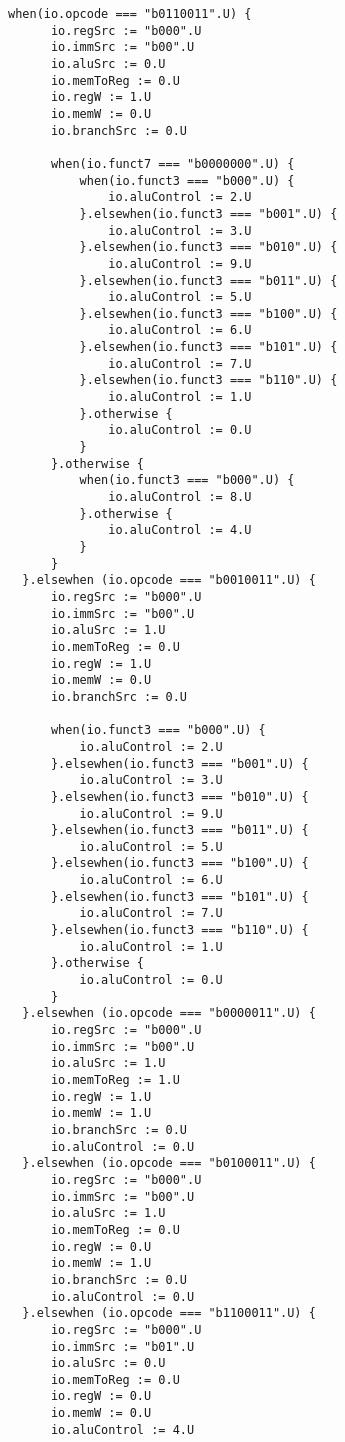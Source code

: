 \documentclass[12pt, letterpaper]{report}
\begin{document}
\begin{lstlisting}[style=scala]
    when(io.opcode === "b0110011".U) {
      io.regSrc := "b000".U
      io.immSrc := "b00".U
      io.aluSrc := 0.U
      io.memToReg := 0.U
      io.regW := 1.U
      io.memW := 0.U
      io.branchSrc := 0.U

      when(io.funct7 === "b0000000".U) {
          when(io.funct3 === "b000".U) {
              io.aluControl := 2.U
          }.elsewhen(io.funct3 === "b001".U) {
              io.aluControl := 3.U
          }.elsewhen(io.funct3 === "b010".U) {
              io.aluControl := 9.U
          }.elsewhen(io.funct3 === "b011".U) {
              io.aluControl := 5.U
          }.elsewhen(io.funct3 === "b100".U) {
              io.aluControl := 6.U
          }.elsewhen(io.funct3 === "b101".U) {
              io.aluControl := 7.U
          }.elsewhen(io.funct3 === "b110".U) {
              io.aluControl := 1.U
          }.otherwise {
              io.aluControl := 0.U
          }
      }.otherwise {
          when(io.funct3 === "b000".U) {
              io.aluControl := 8.U
          }.otherwise {
              io.aluControl := 4.U
          }
      }
  }.elsewhen (io.opcode === "b0010011".U) {
      io.regSrc := "b000".U
      io.immSrc := "b00".U
      io.aluSrc := 1.U
      io.memToReg := 0.U
      io.regW := 1.U
      io.memW := 0.U
      io.branchSrc := 0.U

      when(io.funct3 === "b000".U) {
          io.aluControl := 2.U
      }.elsewhen(io.funct3 === "b001".U) {
          io.aluControl := 3.U
      }.elsewhen(io.funct3 === "b010".U) {
          io.aluControl := 9.U
      }.elsewhen(io.funct3 === "b011".U) {
          io.aluControl := 5.U
      }.elsewhen(io.funct3 === "b100".U) {
          io.aluControl := 6.U
      }.elsewhen(io.funct3 === "b101".U) {
          io.aluControl := 7.U
      }.elsewhen(io.funct3 === "b110".U) {
          io.aluControl := 1.U
      }.otherwise {
          io.aluControl := 0.U
      }
  }.elsewhen (io.opcode === "b0000011".U) {
      io.regSrc := "b000".U
      io.immSrc := "b00".U
      io.aluSrc := 1.U
      io.memToReg := 1.U
      io.regW := 1.U
      io.memW := 1.U
      io.branchSrc := 0.U
      io.aluControl := 0.U
  }.elsewhen (io.opcode === "b0100011".U) {
      io.regSrc := "b000".U
      io.immSrc := "b00".U
      io.aluSrc := 1.U
      io.memToReg := 0.U
      io.regW := 0.U
      io.memW := 1.U
      io.branchSrc := 0.U
      io.aluControl := 0.U
  }.elsewhen (io.opcode === "b1100011".U) {
      io.regSrc := "b000".U
      io.immSrc := "b01".U
      io.aluSrc := 0.U
      io.memToReg := 0.U
      io.regW := 0.U
      io.memW := 0.U
      io.aluControl := 4.U
      

\end{lstlisting}
\end{document}
